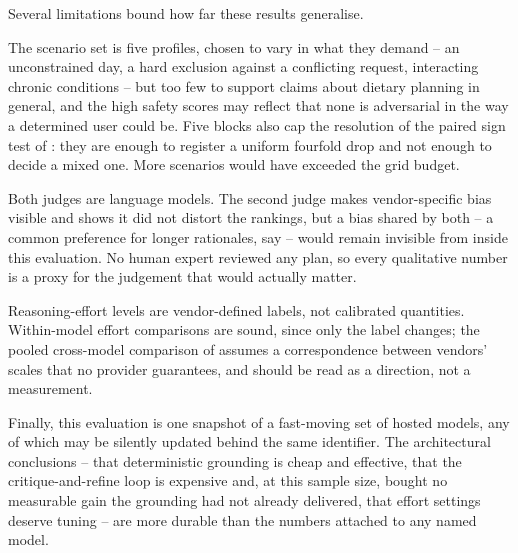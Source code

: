 Several limitations bound how far these results generalise.

The scenario set is five profiles, chosen to vary in what they demand -- an unconstrained day, a hard exclusion against a conflicting request, interacting chronic conditions -- but too few to support claims about dietary planning in general, and the high safety scores may reflect that none is adversarial in the way a determined user could be. Five blocks also cap the resolution of the paired sign test of : they are enough to register a uniform fourfold drop and not enough to decide a mixed one. More scenarios would have exceeded the grid budget.

Both judges are language models. The second judge makes vendor-specific bias visible and  shows it did not distort the rankings, but a bias shared by both -- a common preference for longer rationales, say -- would remain invisible from inside this evaluation. No human expert reviewed any plan, so every qualitative number is a proxy for the judgement that would actually matter.

Reasoning-effort levels are vendor-defined labels, not calibrated quantities. Within-model effort comparisons are sound, since only the label changes; the pooled cross-model comparison of  assumes a correspondence between vendors' scales that no provider guarantees, and should be read as a direction, not a measurement.

Finally, this evaluation is one snapshot of a fast-moving set of hosted models, any of which may be silently updated behind the same identifier. The architectural conclusions -- that deterministic grounding is cheap and effective, that the critique-and-refine loop is expensive and, at this sample size, bought no measurable gain the grounding had not already delivered, that effort settings deserve tuning -- are more durable than the numbers attached to any named model.
